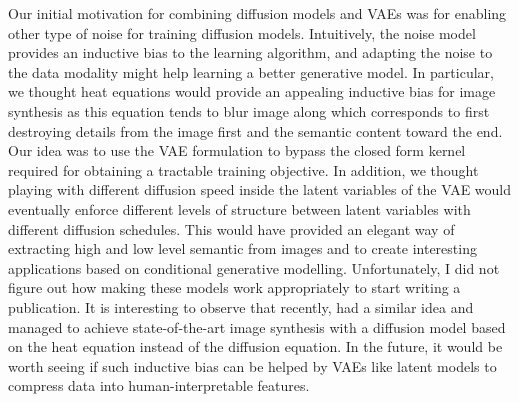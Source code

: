 Our initial motivation for combining diffusion models and VAEs was for enabling other type of noise for training diffusion models. Intuitively, the noise model provides an inductive bias to the learning algorithm, and adapting the noise to the data modality might help learning a better generative model. In particular, we thought heat equations would provide an appealing inductive bias for image synthesis as this equation tends to blur image along which corresponds to first destroying details from the image first and the semantic content toward the end. Our idea was to use the VAE formulation to bypass the closed form kernel required for obtaining a tractable training objective. In addition, we thought playing with different diffusion speed inside the latent variables of the VAE would eventually enforce different levels of structure between latent variables with different diffusion schedules. This would have provided an elegant way of extracting high and low level semantic from images and to create interesting applications based on conditional generative modelling. Unfortunately, I did not figure out how making these models work appropriately to start writing a publication. It is interesting to observe that recently, \citet{rissanen2022generative} had a similar idea and managed to achieve state-of-the-art image synthesis with a diffusion model based on the heat equation instead of the diffusion equation. In the future, it would be worth seeing if such inductive bias can be helped by VAEs like latent models to compress data into human-interpretable features.
